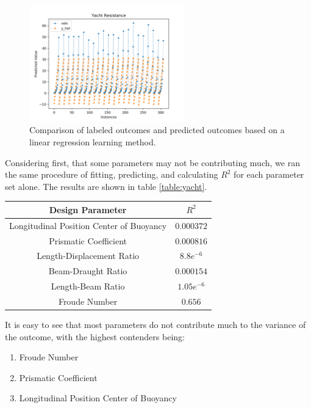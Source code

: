\documentclass[11pt,a4paper]{article}
\begin{document}
\begin{figure}
\centering
\includegraphics[width=0.6\textwidth]{yacht}
\caption{Comparison of labeled outcomes and predicted outcomes based on a linear regression learning method.}
\label{fig:yacht}
\end{figure}

Considering first, that some parameters may not be contributing much, we ran the same procedure of fitting, predicting, and calculating $R^2$ for each parameter set alone. The results are shown in table \ref{table:yacht}.

\begin{center}\label{table:yacht}
 \begin{tabular}{||c | c||} 
 \hline
 Design Parameter & $R^2$ \\ [0.5ex] 
 \hline\hline
 Longitudinal Position Center of Buoyancy & $0.000372$ \\ 
 \hline
 Prismatic Coefficient & $0.000816$ \\
 \hline
 Length-Displacement Ratio & $8.8e^{-6}$ \\
 \hline
 Beam-Draught Ratio & $0.000154$ \\
 \hline
 Length-Beam Ratio & $1.05e^{-6}$ \\
 \hline
 Froude Number & $0.656$ \\ [1ex] 
 \hline
\end{tabular}
\end{center}

It is easy to see that most parameters do not contribute much to the variance of the outcome, with the highest contenders being:

\begin{enumerate}
\item Froude Number
\item Prismatic Coefficient
\item Longitudinal Position Center of Buoyancy
\end{enumerate}
\end{document}

